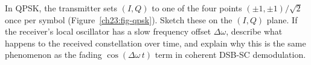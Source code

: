 \begin{exercise}
\label{ch23:ex-constellation}
In QPSK, the transmitter sets $(I,Q)$ to one of the four points $(\pm 1,\pm 1)/\sqrt2$
once per symbol (Figure~\ref{ch23:fig-qpsk}). Sketch these on the $(I,Q)$ plane. If the receiver's local oscillator has
a slow frequency offset $\Delta\omega$, describe what happens to the received constellation
over time, and explain why this is the same phenomenon as the fading $\cos(\Delta\omega\,
t)$ term in coherent DSB-SC demodulation.
\end{exercise}
